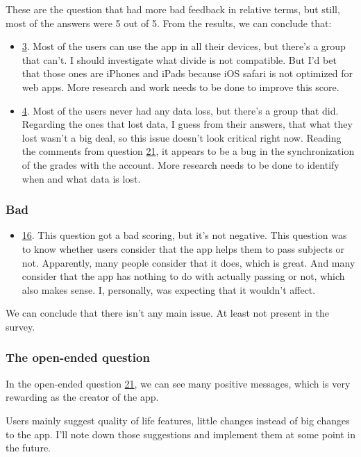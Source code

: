 These are the question that had more bad feedback in relative terms, but still, most of the answers were 5 out of 5. From the results, we can conclude that:
\begin{itemize}[noitemsep]
    \item \hyperref[fig:question-plot-3]{3}. 
        Most of the users can use the app in all their devices, but there's a group that can't. I should investigate what divide is not compatible. But I'd bet that those ones are iPhones and iPads because iOS safari is not optimized for web apps. More research and work needs to be done to improve this score.
    \item \hyperref[fig:question-plot-4]{4}. 
        Most of the users never had any data loss, but there's a group that did. Regarding the ones that lost data, I guess from their answers, that what they lost wasn't a big deal, so this issue doesn't look critical right now. Reading the comments from question \hyperref[fig:question-plot-21]{21}, it appears to be a bug in the synchronization of the grades with the account. More research needs to be done to identify when and what data is lost.
\end{itemize}

\subsubsection{Bad}

\begin{itemize}[noitemsep]
    \item \hyperref[fig:question-plot-16]{16}. 
        This question got a bad scoring, but it's not negative. This question was to know whether users consider that the app helps them to pass subjects or not. Apparently, many people consider that it does, which is great. And many consider that the app has nothing to do with actually passing or not, which also makes sense. I, personally, was expecting that it wouldn't affect.
\end{itemize}

\noindent
We can conclude that there isn't any main issue. At least not present in the survey. 

\subsubsection{The open-ended question}

In the open-ended question \hyperref[fig:question-plot-21]{21}, we can see many positive messages, which is very rewarding as the creator of the app.

Users mainly suggest quality of life features, little changes instead of big changes to the app. I'll note down those suggestions and implement them at some point in the future.
